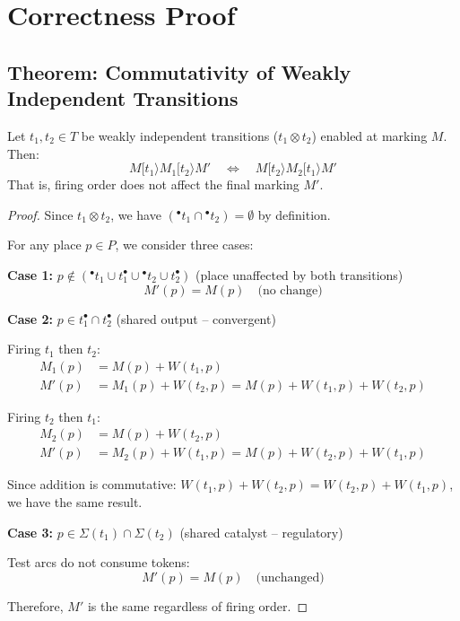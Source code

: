 \section{Correctness Proof}
\label{sec:correctness-proof}

\subsection{Theorem: Commutativity of Weakly Independent Transitions}
\label{subsec:commutativity-theorem}

\begin{theorem}
\label{thm:weak-independence-commutativity}
Let $t_1, t_2 \in T$ be weakly independent transitions ($t_1 \otimes t_2$) enabled at marking $M$. Then:
\begin{equation}
M[t_1\rangle M_1[t_2\rangle M' \quad \Longleftrightarrow \quad M[t_2\rangle M_2[t_1\rangle M'
\end{equation}
That is, firing order does not affect the final marking $M'$.
\end{theorem}

\begin{proof}
Since $t_1 \otimes t_2$, we have $({}^\bullet t_1 \cap {}^\bullet t_2) = \emptyset$ by definition.

For any place $p \in P$, we consider three cases:

\textbf{Case 1:} $p \notin ({}^\bullet t_1 \cup t_1^\bullet \cup {}^\bullet t_2 \cup t_2^\bullet)$ (place unaffected by both transitions)
\begin{equation}
M'(p) = M(p) \quad \text{(no change)}
\end{equation}

\textbf{Case 2:} $p \in t_1^\bullet \cap t_2^\bullet$ (shared output -- convergent)

Firing $t_1$ then $t_2$:
\begin{align}
M_1(p) &= M(p) + W(t_1, p) \\
M'(p) &= M_1(p) + W(t_2, p) = M(p) + W(t_1, p) + W(t_2, p)
\end{align}

Firing $t_2$ then $t_1$:
\begin{align}
M_2(p) &= M(p) + W(t_2, p) \\
M'(p) &= M_2(p) + W(t_1, p) = M(p) + W(t_2, p) + W(t_1, p)
\end{align}

Since addition is commutative: $W(t_1, p) + W(t_2, p) = W(t_2, p) + W(t_1, p)$, we have the same result.

\textbf{Case 3:} $p \in \Sigma(t_1) \cap \Sigma(t_2)$ (shared catalyst -- regulatory)

Test arcs do not consume tokens:
\begin{equation}
M'(p) = M(p) \quad \text{(unchanged)}
\end{equation}

Therefore, $M'$ is the same regardless of firing order.
\end{proof}

